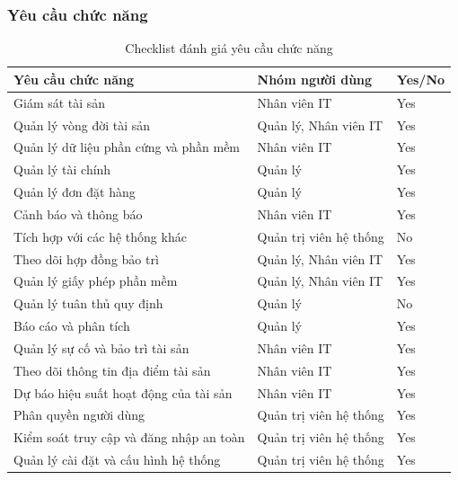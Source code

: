 \subsubsection{Yêu cầu chức năng}
\begin{table}[H]
    \centering
    \caption{Checklist đánh giá yêu cầu chức năng}
    \begin{tabular}{|l|l|l|}
        \hline
        \textbf{Yêu cầu chức năng} & \textbf{Nhóm người dùng} & \textbf{Yes/No} \\
        \hline
        Giám sát tài sản & Nhân viên IT & Yes \\
        \hline
        Quản lý vòng đời tài sản & Quản lý, Nhân viên IT & Yes \\
        \hline
        Quản lý dữ liệu phần cứng và phần mềm & Nhân viên IT & Yes \\
        \hline
        Quản lý tài chính & Quản lý & Yes \\
        \hline
        Quản lý đơn đặt hàng & Quản lý & Yes \\
        \hline
        Cảnh báo và thông báo & Nhân viên IT & Yes \\
        \hline
        Tích hợp với các hệ thống khác & Quản trị viên hệ thống & No \\
        \hline
        Theo dõi hợp đồng bảo trì & Quản lý, Nhân viên IT & Yes \\
        \hline
        Quản lý giấy phép phần mềm & Quản lý, Nhân viên IT & Yes \\
        \hline
        Quản lý tuân thủ quy định & Quản lý & No \\
        \hline
        Báo cáo và phân tích & Quản lý & Yes \\
        \hline
        Quản lý sự cố và bảo trì tài sản & Nhân viên IT & Yes \\
        \hline
        Theo dõi thông tin địa điểm tài sản & Nhân viên IT & Yes \\
        \hline
        Dự báo hiệu suất hoạt động của tài sản & Nhân viên IT & Yes \\
        \hline
        Phân quyền người dùng & Quản trị viên hệ thống & Yes \\
        \hline
        Kiểm soát truy cập và đăng nhập an toàn & Quản trị viên hệ thống & Yes \\
        \hline
        Quản lý cài đặt và cấu hình hệ thống & Quản trị viên hệ thống & Yes \\
        \hline
    \end{tabular}
    
\end{table}
